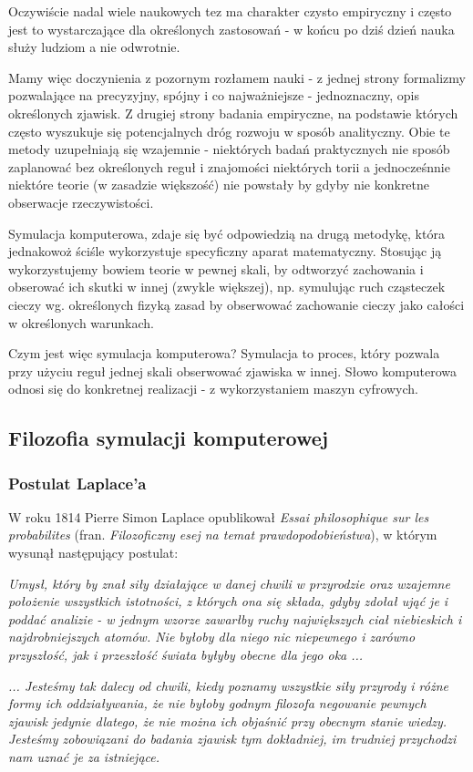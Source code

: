 \par{
Oczywiście nadal wiele naukowych tez ma charakter czysto empiryczny i często jest to wystarczające dla określonych zastosowań - w końcu po dziś dzień nauka służy ludziom a nie odwrotnie.
}

\par{
Mamy więc doczynienia z pozornym rozłamem nauki - z jednej strony formalizmy pozwalające na precyzyjny, spójny i co najważniejsze - jednoznaczny, opis określonych zjawisk. Z drugiej strony badania empiryczne, na podstawie których często wyszukuje się potencjalnych dróg rozwoju w sposób analityczny. Obie te metody uzupełniają się wzajemnie - niektórych badań praktycznych nie sposób zaplanować bez określonych reguł i znajomości niektórych torii a jednocześnnie niektóre teorie (w zasadzie większość) nie powstały by gdyby nie konkretne obserwacje rzeczywistości.
}

\par{
Symulacja komputerowa, zdaje się być odpowiedzią na drugą metodykę, która jednakowoż ściśle wykorzystuje specyficzny aparat matematyczny. Stosując ją wykorzystujemy bowiem teorie w pewnej skali, by odtworzyć zachowania i obserować ich skutki w innej (zwykle większej), np. symulując ruch cząsteczek cieczy wg. określonych fizyką zasad by obserwować zachowanie cieczy jako całości w określonych warunkach.
}

\par{
Czym jest więc symulacja komputerowa? Symulacja to proces, który pozwala przy użyciu reguł jednej skali obserwować zjawiska w innej. Słowo komputerowa odnosi się do konkretnej realizacji - z wykorzystaniem maszyn cyfrowych.
}

\subsection{Filozofia symulacji komputerowej}

\subsubsection{Postulat Laplace'a}
\par{
W roku 1814 Pierre Simon Laplace opublikował \textit{Essai philosophique sur les probabilites} (fran. \textit{Filozoficzny esej na temat prawdopodobieństwa}), w którym wysunął następujący postulat:
}
\par{
\textit{Umysł, który by znał siły działające w danej chwili w przyrodzie oraz wzajemne położenie wszystkich istotności, z których ona się składa, gdyby zdołał ująć je i poddać analizie - w jednym wzorze zawarłby ruchy największych ciał niebieskich i najdrobniejszych atomów. Nie byłoby dla niego nic niepewnego i zarówno przyszłość, jak i przeszłość świata byłyby obecne dla jego oka ...
}}
\par{
\textit{... Jesteśmy tak dalecy od chwili, kiedy poznamy wszystkie siły przyrody i różne formy ich oddziaływania, że nie byłoby godnym filozofa negowanie pewnych zjawisk jedynie dlatego, że nie można ich objaśnić przy obecnym stanie wiedzy. Jesteśmy zobowiązani do badania zjawisk tym dokładniej, im trudniej przychodzi nam uznać je za istniejące.}
}


